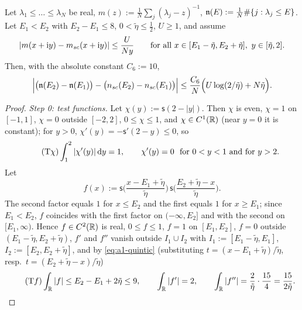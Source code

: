 \begin{lemma}\label{lem:count}
Let $\lambda_1\le\dots\le\lambda_N$ be real, $m(z):=\frac1N\sum_j(\lambda_j-z)^{-1}$, $\mathfrak{n}(E):=\frac1N\#\{j:\lambda_j\le E\}$. Let $E_1<E_2$ with $E_2-E_1\le8$, $0<\tilde\eta\le\frac12$, $U\ge1$, and assume
\begin{equation}\label{eq:HShyp}
 |m(x+\mathrm{i} y)-m_{sc}(x+\mathrm{i} y)|\le\frac{U}{Ny}\qquad\text{for all }x\in[E_1-\tilde\eta,E_2+\tilde\eta],\ y\in[\tilde\eta,2].
\end{equation}
Then, with the absolute constant $C_6:=10$,
\[
 \Big|\big(\mathfrak{n}(E_2)-\mathfrak{n}(E_1)\big)-\big(n_{sc}(E_2)-n_{sc}(E_1)\big)\Big|\le\frac{C_6}{N}\Big(U\log(2/\tilde\eta)+N\tilde\eta\Big).
\]
\end{lemma}
\begin{proof}
\emph{Step 0: test functions.} Let $\chi(y):=\mathsf s(2-|y|)$. Then $\chi$ is even, $\chi=1$ on $[-1,1]$, $\chi=0$ outside $[-2,2]$, $0\le\chi\le1$, and $\chi\in C^1(\mathbb{R})$ (near $y=0$ it is constant); for $y>0$, $\chi'(y)=-\mathsf s'(2-y)\le0$, so
\begin{equation}\tag{T$\chi$}\label{eq:a1-chi}
 \int_1^2|\chi'(y)|\,\mathrm{d} y=1,\qquad \chi'(y)=0\ \text{ for }0<y<1\text{ and for }y>2 .
\end{equation}
Let
\[
 f(x):=\mathsf s\Big(\frac{x-E_1+\tilde\eta}{\tilde\eta}\Big)\,\mathsf s\Big(\frac{E_2+\tilde\eta-x}{\tilde\eta}\Big).
\]
The second factor equals $1$ for $x\le E_2$ and the first equals $1$ for $x\ge E_1$; since $E_1<E_2$, $f$ coincides with the first factor on $(-\infty,E_2]$ and with the second on $[E_1,\infty)$. Hence $f\in C^2(\mathbb{R})$ is real, $0\le f\le1$,
$f=1$ on $[E_1,E_2]$, $f=0$ outside $(E_1-\tilde\eta,E_2+\tilde\eta)$, $f'$ and $f''$ vanish outside $I_1\cup I_2$ with $I_1:=[E_1-\tilde\eta,E_1]$, $I_2:=[E_2,E_2+\tilde\eta]$, and by \eqref{eq:a1-quintic} (substituting $t=(x-E_1+\tilde\eta)/\tilde\eta$, resp.\ $t=(E_2+\tilde\eta-x)/\tilde\eta$)
\begin{equation}\tag{T$f$}\label{eq:a1-fbounds}
 \int_{\mathbb{R}}|f|\le E_2-E_1+2\tilde\eta\le9,\qquad\int_{\mathbb{R}}|f'|=2,\qquad\int_{\mathbb{R}}|f''|=\frac{2}{\tilde\eta}\cdot\frac{15}4=\frac{15}{2\tilde\eta}.
\end{equation}


\end{proof}
